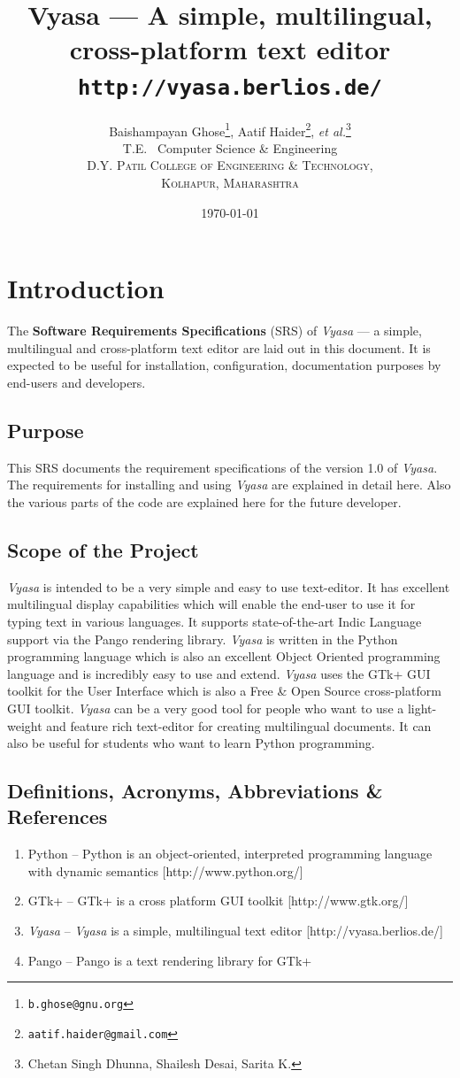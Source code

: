 \documentclass[12pt,a4paper]{article}
\title {Vyasa --- A simple, multilingual, cross-platform text editor \\ \small{\texttt{http://vyasa.berlios.de/}}}
\author {\large{Baishampayan Ghose\footnote{\texttt{b.ghose@gnu.org}},
    Aatif Haider\footnote{\texttt{aatif.haider@gmail.com}}, \textit{et
      al.}\footnote{Chetan Singh Dhunna, Shailesh Desai, Sarita K.}} \\\small{T.E.~ Computer Science \&{} Engineering}\\ \small{\textsc{D.Y. Patil College of Engineering \&{} Technology,}}
\\ \small{\textsc{Kolhapur, Maharashtra}}}
\date{\small{\today}}
\newcommand{\VS}{\textit{Vyasa}}
\begin{document}
\maketitle
\tableofcontents
\listoffigures
\newpage
\section{Introduction}
The {\bfseries Software Requirements Specifications} (SRS) of
\VS{} --- a simple, multilingual and cross-platform text editor
are laid out in this document. It is expected to be useful for
installation, configuration, documentation purposes by end-users and developers.

\subsection{Purpose}
This SRS documents the requirement specifications of the version 1.0 of
\VS. The requirements for installing and using \VS{} are explained in
detail here. Also the various parts of the code are explained here for
the future developer.

\subsection{Scope of the Project}
\VS{} is intended to be a very simple and easy to use text-editor. It
has excellent multilingual display capabilities which will enable the
end-user to use it for typing text in various languages. It supports
state-of-the-art Indic Language support via the Pango rendering
library. \VS{} is written in the Python programming language which is
also an excellent Object Oriented programming language and is incredibly
easy to use and extend. \VS{} uses the GTk+ GUI toolkit for the User
Interface which is also a Free \&{} Open Source cross-platform GUI
toolkit.
\VS{} can be a very good tool for people who want to use a light-weight
and feature rich text-editor for creating multilingual documents. It can
also be useful for students who want to learn Python programming.

\subsection{Definitions, Acronyms, Abbreviations \&{} References}
\begin{enumerate}
\item Python -- Python is an object-oriented, interpreted programming
  language with dynamic semantics [http://www.python.org/]
\item GTk+ -- GTk+ is a cross platform GUI toolkit [http://www.gtk.org/]
\item \VS{} -- \VS{} is a simple, multilingual text editor
  [http://vyasa.berlios.de/]
\item Pango -- Pango is a text rendering library for GTk+
\end{enumerate}
\end{document}
